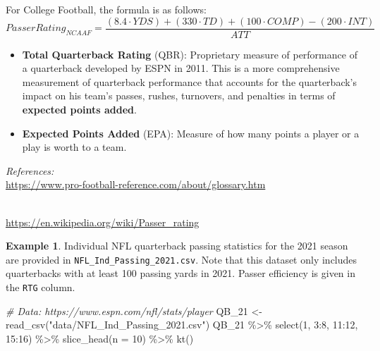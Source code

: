 \documentclass[
  11pt,
]{book}
\newenvironment{Shaded}{\begin{snugshade}}{\end{snugshade}}
\newcommand{\AttributeTok}[1]{\textcolor[rgb]{0.77,0.63,0.00}{#1}}
\newcommand{\CommentTok}[1]{\textcolor[rgb]{0.56,0.35,0.01}{\textit{#1}}}
\newcommand{\DecValTok}[1]{\textcolor[rgb]{0.00,0.00,0.81}{#1}}
\newcommand{\FunctionTok}[1]{\textcolor[rgb]{0.00,0.00,0.00}{#1}}
\newcommand{\NormalTok}[1]{#1}
\newcommand{\OtherTok}[1]{\textcolor[rgb]{0.56,0.35,0.01}{#1}}
\newcommand{\SpecialCharTok}[1]{\textcolor[rgb]{0.00,0.00,0.00}{#1}}
\newcommand{\StringTok}[1]{\textcolor[rgb]{0.31,0.60,0.02}{#1}}
\theoremstyle{definition}
\theoremstyle{definition}
\newtheorem{example}{Example}[chapter]
\theoremstyle{definition}
\theoremstyle{definition}
\theoremstyle{remark}
\begin{document}
For College Football, the formula is as follows:\\

\[Passer Rating_{NCAAF} = \frac{(8.4 \cdot YDS) + (330 \cdot TD) + (100 \cdot COMP) - (200 \cdot INT)}{ATT}\]

\begin{itemize}
\item
  \textbf{Total Quarterback Rating} (QBR): Proprietary measure of performance of a quarterback developed by ESPN in 2011. This is a more comprehensive measurement of quarterback performance that accounts for the quarterback's impact on his team's passes, rushes, turnovers, and penalties in terms of \textbf{expected points added}.
\item
  \textbf{Expected Points Added} (EPA): Measure of how many points a player or a play is worth to a team.
\end{itemize}

\emph{References:}\\
\url{https://www.pro-football-reference.com/about/glossary.htm}\strut \\
\url{https://en.wikipedia.org/wiki/Passer_rating}

\newpage

\begin{example}
Individual NFL quarterback passing statistics for the 2021 season are provided in \texttt{NFL\_Ind\_Passing\_2021.csv}. Note that this dataset only includes quarterbacks with at least 100 passing yards in 2021. Passer efficiency is given in the \texttt{RTG} column.
\end{example}

\begin{Shaded}
\begin{Highlighting}[]
\CommentTok{\# Data: https://www.espn.com/nfl/stats/player}
\NormalTok{QB\_21 }\OtherTok{\textless{}{-}} \FunctionTok{read\_csv}\NormalTok{(}\StringTok{"data/NFL\_Ind\_Passing\_2021.csv"}\NormalTok{)}
\NormalTok{QB\_21 }\SpecialCharTok{\%\textgreater{}\%}
    \FunctionTok{select}\NormalTok{(}\DecValTok{1}\NormalTok{, }\DecValTok{3}\SpecialCharTok{:}\DecValTok{8}\NormalTok{, }\DecValTok{11}\SpecialCharTok{:}\DecValTok{12}\NormalTok{, }\DecValTok{15}\SpecialCharTok{:}\DecValTok{16}\NormalTok{) }\SpecialCharTok{\%\textgreater{}\%}
    \FunctionTok{slice\_head}\NormalTok{(}\AttributeTok{n =} \DecValTok{10}\NormalTok{) }\SpecialCharTok{\%\textgreater{}\%}
    \FunctionTok{kt}\NormalTok{()}
\end{Highlighting}
\end{Shaded}
\end{document}
